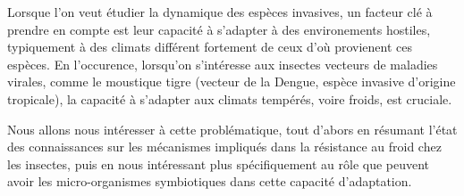 Lorsque l’on veut étudier la dynamique des espèces invasives, un facteur clé à
prendre en compte est leur capacité à s’adapter à des environements hostiles,
typiquement à des climats différent fortement de ceux d’où provienent ces
espèces. En l’occurence, lorsqu’on s’intéresse aux insectes vecteurs de
maladies virales, comme le moustique tigre  (vecteur de
la Dengue, espèce invasive d’origine tropicale), la capacité à s’adapter aux
climats tempérés, voire froids, est cruciale.

Nous allons nous intéresser à cette problématique, tout d’abors en résumant
l’état des connaissances sur les mécanismes impliqués dans la résistance au
froid chez les insectes, puis en nous intéressant plus spécifiquement au rôle
que peuvent avoir les micro-organismes symbiotiques dans cette capacité
d’adaptation.
